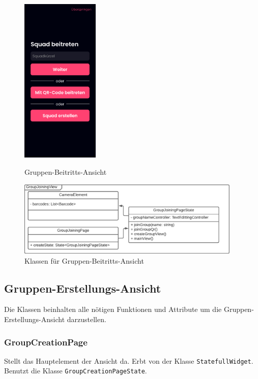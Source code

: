 \documentclass{entwurfsheft}
\begin{document}
    \begin{figure}[htp]
        \begin{minipage}
            [t]{0.49\textwidth}
            \centering
            \includegraphics[height=80mm]{images/Presentation-layer/GroupJoiningView.jpg}
            \caption{Gruppen-Beitritts-Ansicht}
        \end{minipage}
        \begin{minipage}
            [t]{0.49\textwidth}
            \centering
            \includegraphics[width=0.95\textwidth]{images/Presentation-layer/GroupJoiningViewClass.pdf}
            \caption{Klassen für Gruppen-Beitritts-Ansicht}
        \end{minipage}
    \end{figure} 
        
    \newpage        

\subsection{Gruppen-Erstellungs-Ansicht}
Die Klassen beinhalten alle nötigen Funktionen und Attribute um die Gruppen-Erstellungs-Ansicht darzustellen.

    \subsubsection{GroupCreationPage}
    Stellt das Hauptelement der Ansicht da. Erbt von der Klasse \texttt{StatefullWidget}. Benutzt die Klasse \texttt{GroupCreationPageState}. 
\end{document}

